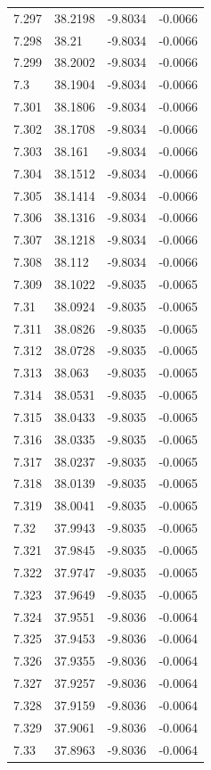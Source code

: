 \begin{tabular}{llll}
7.297 & 38.2198 & -9.8034 & -0.0066 \\
7.298 & 38.21 & -9.8034 & -0.0066 \\
7.299 & 38.2002 & -9.8034 & -0.0066 \\
7.3 & 38.1904 & -9.8034 & -0.0066 \\
7.301 & 38.1806 & -9.8034 & -0.0066 \\
7.302 & 38.1708 & -9.8034 & -0.0066 \\
7.303 & 38.161 & -9.8034 & -0.0066 \\
7.304 & 38.1512 & -9.8034 & -0.0066 \\
7.305 & 38.1414 & -9.8034 & -0.0066 \\
7.306 & 38.1316 & -9.8034 & -0.0066 \\
7.307 & 38.1218 & -9.8034 & -0.0066 \\
7.308 & 38.112 & -9.8034 & -0.0066 \\
7.309 & 38.1022 & -9.8035 & -0.0065 \\
7.31 & 38.0924 & -9.8035 & -0.0065 \\
7.311 & 38.0826 & -9.8035 & -0.0065 \\
7.312 & 38.0728 & -9.8035 & -0.0065 \\
7.313 & 38.063 & -9.8035 & -0.0065 \\
7.314 & 38.0531 & -9.8035 & -0.0065 \\
7.315 & 38.0433 & -9.8035 & -0.0065 \\
7.316 & 38.0335 & -9.8035 & -0.0065 \\
7.317 & 38.0237 & -9.8035 & -0.0065 \\
7.318 & 38.0139 & -9.8035 & -0.0065 \\
7.319 & 38.0041 & -9.8035 & -0.0065 \\
7.32 & 37.9943 & -9.8035 & -0.0065 \\
7.321 & 37.9845 & -9.8035 & -0.0065 \\
7.322 & 37.9747 & -9.8035 & -0.0065 \\
7.323 & 37.9649 & -9.8035 & -0.0065 \\
7.324 & 37.9551 & -9.8036 & -0.0064 \\
7.325 & 37.9453 & -9.8036 & -0.0064 \\
7.326 & 37.9355 & -9.8036 & -0.0064 \\
7.327 & 37.9257 & -9.8036 & -0.0064 \\
7.328 & 37.9159 & -9.8036 & -0.0064 \\
7.329 & 37.9061 & -9.8036 & -0.0064 \\
7.33 & 37.8963 & -9.8036 & -0.0064 \\

\end{tabular}
